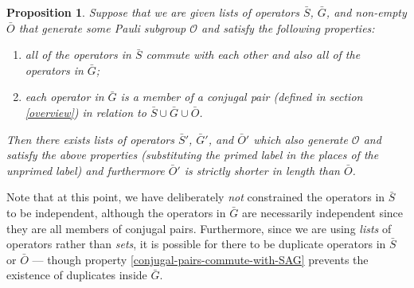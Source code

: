 \documentclass[twocolumn,showpacs,preprintnumbers,amsmath,amssymb,nofootinbib,pra,floatfix]{revtex4}
\newtheorem{proposition}{Proposition}
\newenvironment{remark}[1][Remark]{\begin{trivlist}
\item[\hskip \labelsep {\bfseries #1}]}{\end{trivlist}}
\begin{document}
\begin{proposition} Suppose that we are given lists of operators $\bar S$, $\bar G$, and non-empty $\bar O$ that generate some Pauli subgroup $\mathcal{O}$ and satisfy the following properties:
\begin{enumerate}
\item all of the operators in $\bar S$ commute with each other and also all of the operators in $\bar G$; \label{stabs-commute-with-G}
\item each operator in $\bar G$ is a member of a \emph{conjugal pair} (defined in section \ref{overview}) in relation to $\bar S \cup \bar G \cup \bar O$. \label{conjugal-pairs-commute-with-SAG}
\end{enumerate}
Then there exists lists of operators $\bar S'$, $\bar G'$, and $\bar O'$ which also generate $\mathcal{O}$ and satisfy the above properties (substituting the primed label in the places of the unprimed label) and furthermore $\bar O'$ is strictly shorter in length than $\bar O$.
\end{proposition}

\begin{remark}
Note that at this point, we have deliberately \emph{not} constrained the operators in $\bar S$ to be independent, although the operators in $\bar G$ are necessarily independent since they are all members of conjugal pairs.  Furthermore, since we are using \emph{lists} of operators rather than \emph{sets}, it is possible for there to be duplicate operators in $\bar S$ or $\bar O$ --- though property \ref{conjugal-pairs-commute-with-SAG} prevents the existence of duplicates inside $\bar G$.
\end{remark}
\end{document}
